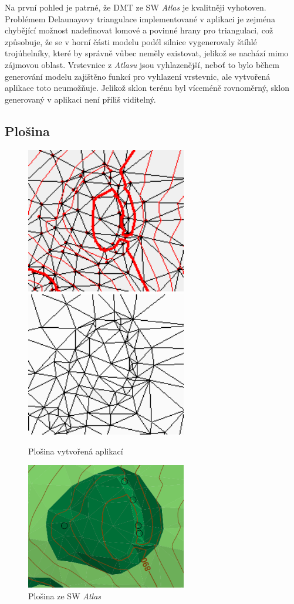 \documentclass[a4paper, 12pt]{article}
\begin{document}
Na první pohled je patrné, že DMT ze SW \textit{Atlas} je kvalitněji vyhotoven. Problémem  Delaunayovy triangulace implementované v aplikaci je zejména chybějící možnost nadefinovat lomové a povinné hrany pro triangulaci, což způsobuje, že se v horní části modelu podél silnice vygenerovaly štíhlé trojúhelníky, které by správně vůbec neměly existovat, jelikož se nachází mimo zájmovou oblast. Vrstevnice z \textit{Atlasu} jsou vyhlazenější, neboť to bylo během generování modelu zajištěno funkcí pro vyhlazení vrstevnic, ale vytvořená aplikace toto neumožňuje. Jelikož sklon terénu byl víceméně rovnoměrný, sklon generovaný v aplikaci není příliš viditelný. 

\subsection{Plošina}
\begin{figure}[h!]
	\centering
	\includegraphics[width=7cm]{./pictures/kupec_plateau_contours.png}
	\includegraphics[width=7cm]{./pictures/kupec_plateau_slope.png}
	\caption{Plošina vytvořená aplikací}
\end{figure}

\begin{figure}[h!]
	\centering
	\includegraphics[width=7cm]{./pictures/atlas_plateau.png}
	\caption{Plošina ze SW \textit{Atlas}}
\end{figure}
\end{document}
